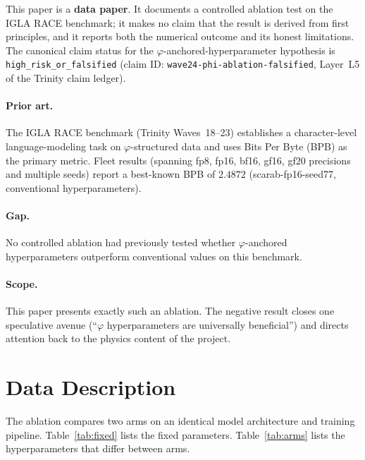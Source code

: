 \documentclass[11pt,a4paper]{article}
\begin{document}
This paper is a \textbf{data paper}.  It documents a controlled ablation
test on the IGLA RACE benchmark; it makes no claim that the result is
derived from first principles, and it reports both the numerical outcome
and its honest limitations.  The canonical claim status for the
$\varphi$-anchored-hyperparameter hypothesis is
\texttt{high\_risk\_or\_falsified} (claim ID:
\texttt{wave24-phi-ablation-falsified}, Layer~L5 of the Trinity claim
ledger).

\paragraph{Prior art.}  The IGLA RACE benchmark (Trinity Waves~18--23)
establishes a character-level language-modeling task on $\varphi$-structured
data and uses Bits Per Byte (BPB) as the primary metric.  Fleet results
(spanning fp8, fp16, bf16, gf16, gf20 precisions and multiple seeds)
report a best-known BPB of $2.4872$ (scarab-fp16-seed77, conventional
hyperparameters).

\paragraph{Gap.}  No controlled ablation had previously tested whether
$\varphi$-anchored hyperparameters outperform conventional values on this
benchmark.

\paragraph{Scope.}  This paper presents exactly such an ablation.  The
negative result closes one speculative avenue (``$\varphi$ hyperparameters
are universally beneficial'') and directs attention back to the physics
content of the project.

\section{Data Description}
\label{sec:data}

The ablation compares two arms on an identical model architecture and
training pipeline.  Table~\ref{tab:fixed} lists the fixed parameters.
Table~\ref{tab:arms} lists the hyperparameters that differ between arms.
\end{document}

